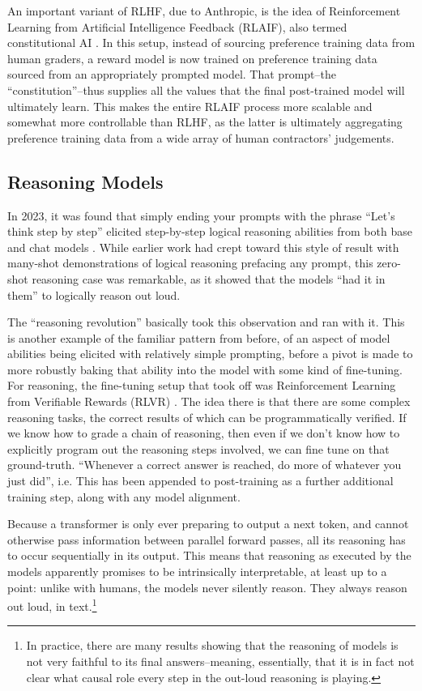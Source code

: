 An important variant of RLHF, due to Anthropic, is the idea of Reinforcement
Learning from Artificial Intelligence Feedback (RLAIF), also termed
constitutional AI \cite{bai2022constitutional}. In this setup, instead of
sourcing preference training data from human graders, a reward model is now
trained on preference training data sourced from an appropriately prompted
model. That prompt--the ``constitution''--thus supplies all the values that the
final post-trained model will ultimately learn. This makes the entire RLAIF
process more scalable and somewhat more controllable than RLHF, as the latter
is ultimately aggregating preference training data from a wide array of human
contractors' judgements.

\subsection{Reasoning Models}
In 2023, it was found that simply ending your prompts with the phrase ``Let's
think step by step'' elicited step-by-step logical reasoning abilities from
both base and chat models \cite{kojima2023zeroshot}. While earlier work had
crept toward this style of result with many-shot demonstrations of logical
reasoning prefacing any prompt, this zero-shot reasoning case was remarkable,
as it showed that the models ``had it in them'' to logically reason out loud.

The ``reasoning revolution'' basically took this observation and ran with it.
This is another example of the familiar pattern from before, of an aspect of
model abilities being elicited with relatively simple prompting, before a pivot
is made to more robustly baking that ability into the model with some kind of
fine-tuning. For reasoning, the fine-tuning setup that took off was
Reinforcement Learning from Verifiable Rewards (RLVR) \cite{lambert2025tulu}.
The idea there is that there are some complex reasoning tasks, the correct
results of which can be programmatically verified. If we know how to grade a
chain of reasoning, then even if we don't know how to explicitly program out
the reasoning steps involved, we can fine tune on that ground-truth. ``Whenever
a correct answer is reached, do more of whatever you just did'', i.e. This has
been appended to post-training as a further additional training step, along
with any model alignment.

Because a transformer is only ever preparing to output a next token, and cannot
otherwise pass information between parallel forward passes, all its reasoning
has to occur sequentially in its output. This means that reasoning as executed
by the models apparently promises to be intrinsically interpretable, at least
up to a point: unlike with humans, the models never silently reason. They
always reason out loud, in text.\footnote{In practice, there are many results
showing that the reasoning of models is not very faithful to its final
answers--meaning, essentially, that it is in fact not clear what causal role
every step in the out-loud reasoning is playing.}

